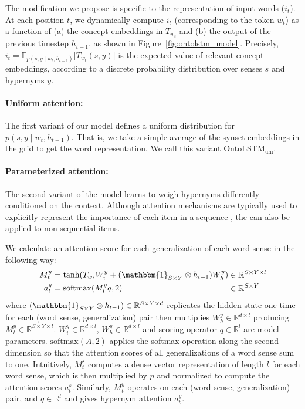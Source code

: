 The modification we propose is specific to the representation of input words ($i_t$). 
At each position $t$, we dynamically compute $i_t$ (corresponding to the token $w_t$) as a function of (a) the concept embeddings in $T_{w_t}$ and (b) the output of the previous timestep $h_{t-1}$, as shown in Figure~\ref{fig:ontolstm_model}.
Precisely, $i_t = \mathbb{E}_{p(s,y\mid w_t, h_{t-1})}\big[ T_{w_t}(s,y) \big]$ is the expected value of relevant concept embeddings, according to a discrete probability distribution over senses $s$ and hypernyms $y$.

\paragraph{Uniform attention:} The first variant of our model defines a uniform distribution for $p(s,y \mid w_t, h_{t-1})$. That is, we take a simple average of the synset embeddings in the grid to get the word representation. We call this variant \textbf{$\text{OntoLSTM}_{\text{uni}}$}.

\paragraph{Parameterized attention:}
The second variant of the model learns to weigh hypernyms differently conditioned on the context.
Although attention mechanisms are typically used to explicitly represent the importance of each item in a sequence \citep{bahdanau:14}, the can also be applied to non-sequential items.

We calculate an attention score for each generalization of each word sense in the following way:
\begin{equation}
\begin{aligned}[c]
M_t^y &= \tanh(T_{w_t}W_i^y + (\mathbbm{1}_{S \times Y}\otimes h_{t-1}) W_h^y) \nonumber \\
a_t^y &= \mathrm{softmax}(M_t^y q, 2) \nonumber \\
\end{aligned}
\begin{aligned}
&\in \mathbb{R}^{S\times Y \times l} \\
&\in \mathbb{R}^{S\times Y} \\
\end{aligned}
\end{equation}
where $(\mathbbm{1}_{S \times Y}\otimes h_{t-1}) \in \mathbb{R}^{S \times Y \times d}$ replicates the hidden state one time for each (word sense, generalization) pair then multiplies $W_h^y \in \mathbb{R}^{d \times l}$ producing $M_t^y \in \mathbb{R}^{S\times Y \times l}$. $W_i^y \in \mathbb{R}^{d \times l}$, $W_h^y \in \mathbb{R}^{d \times l}$ and scoring operator $q \in \mathbb{R}^l$ are model parameters. $\mathrm{softmax}(A,2)$ applies the softmax operation along the second dimension so that the attention scores of all generalizations of a word sense sum to one. Intuitively, $M_t^s$ computes a dense vector representation of length $l$ for each word sense, which is then multiplied by $p$ and normalized to compute the attention scores $a_t^s$. Similarly, $M_t^y$ operates on each (word sense, generalization) pair, and $q \in \mathbb{R}^l$ and gives hypernym attention $a_t^y$.

